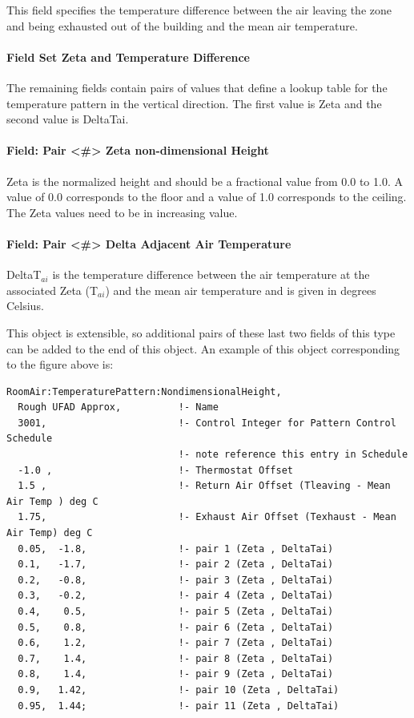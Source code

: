 This field specifies the temperature difference between the air leaving the zone and being exhausted out of the building and the mean air temperature.

\paragraph{Field Set Zeta and Temperature Difference}\label{field-set-zeta-and-temperature-difference}

The remaining fields contain pairs of values that define a lookup table for the temperature pattern in the vertical direction. The first value is Zeta and the second value is DeltaTai.

\paragraph{Field: Pair \textless{}\#\textgreater{} Zeta non-dimensional Height}\label{field-pair-zeta-non-dimensional-height}

Zeta is the normalized height and should be a fractional value from 0.0 to 1.0. A value of 0.0 corresponds to the floor and a value of 1.0 corresponds to the ceiling. The Zeta values need to be in increasing value.

\paragraph{Field: Pair \textless{}\#\textgreater{} Delta Adjacent Air Temperature}\label{field-pair-delta-adjacent-air-temperature}

DeltaT\(_{ai}\) is the temperature difference between the air temperature at the associated Zeta (T\(_{ai}\)) and the mean air temperature and is given in degrees Celsius.

This object is extensible, so additional pairs of these last two fields of this type can be added to the end of this object. An example of this object corresponding to the figure above is:

\begin{lstlisting}
RoomAir:TemperaturePattern:NondimensionalHeight,
  Rough UFAD Approx,          !- Name
  3001,                       !- Control Integer for Pattern Control Schedule
                              !- note reference this entry in Schedule
  -1.0 ,                      !- Thermostat Offset
  1.5 ,                       !- Return Air Offset (Tleaving - Mean Air Temp ) deg C
  1.75,                       !- Exhaust Air Offset (Texhaust - Mean Air Temp) deg C
  0.05,  -1.8,                !- pair 1 (Zeta , DeltaTai)
  0.1,   -1.7,                !- pair 2 (Zeta , DeltaTai)
  0.2,   -0.8,                !- pair 3 (Zeta , DeltaTai)
  0.3,   -0.2,                !- pair 4 (Zeta , DeltaTai)
  0.4,    0.5,                !- pair 5 (Zeta , DeltaTai)
  0.5,    0.8,                !- pair 6 (Zeta , DeltaTai)
  0.6,    1.2,                !- pair 7 (Zeta , DeltaTai)
  0.7,    1.4,                !- pair 8 (Zeta , DeltaTai)
  0.8,    1.4,                !- pair 9 (Zeta , DeltaTai)
  0.9,   1.42,                !- pair 10 (Zeta , DeltaTai)
  0.95,  1.44;                !- pair 11 (Zeta , DeltaTai)
\end{lstlisting}


